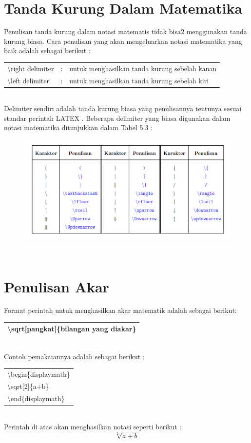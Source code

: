 \section{Tanda Kurung Dalam Matematika}
Penulisan tanda kurung dalam notasi matematis tidak bisa2 menggunakan tanda kurung biasa. Cara penulisan yang akan mengeluarkan notasi matematika yang baik adalah sebagai berikut :\\[0.5 cm]
\begin{tabular}{lll}
\textbackslash right delimiter& :& untuk menghasilkan tanda kurung sebelah kanan\\
\textbackslash left delimiter& : &untuk menghasilkan tanda kurung sebelah kiri\\
\end{tabular}\\[0.5 cm]
Delimiter sendiri adalah tanda kurung biasa yang penulisannya tentunya sesuai standar perintah LATEX . Beberapa delimiter yang biasa digunakan dalam notasi matematika ditunjukkan dalam Tabel 5.3 :\\[0.5 cm]
\begin{figure}[h!]
\centering
\includegraphics[width=10 cm]{img/12.png}
\end{figure}\\[0.5 cm]
\section{Penulisan Akar}
Format perintah untuk menghasilkan akar matematik adalah sebagai berikut:\\[0.5 cm]
\begin{tabular}{|p{13.5 cm}|}
\hline
\textbackslash sqrt[pangkat]\{bilangan yang diakar\}\\
\hline
\end{tabular}\\[0.5 cm]
  Contoh pemakaiannya adalah sebagai berikut :\\[0.5 cm]
\begin{tabular}{|p{13.5 cm}|}
\hline
\textbackslash begin\{displaymath\}\\
   \textbackslash sqrt[2]\{a+b\}\\
\textbackslash end\{displaymath\}\\
\hline
\end{tabular}\\[0.5 cm]
 Perintah di atas akan menghasilkan notasi seperti berikut :\\[0.5 cm]
\begin{displaymath}
\sqrt[2]{a+b}
\end{displaymath}
